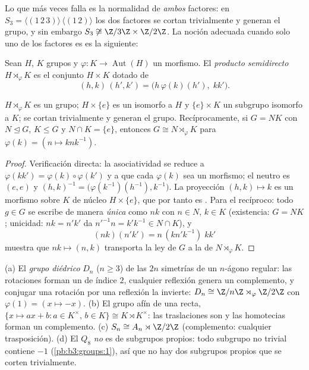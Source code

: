Lo que más veces falla es la normalidad de \emph{ambos} factores: en
$S_3
= \langle (1\,2\,3)\rangle \,\langle(1\,2)\rangle$ los dos factores se
cortan trivialmente y generan el grupo, y sin embargo
$S_3 \not\cong \Z/3\Z \times
\Z/2\Z$. La noción adecuada cuando solo uno de los factores es
 es la siguiente:

\begin{definition}\label{def:b3:groups:semidirect}
Sean $H$, $K$ grupos y $\varphi \colon K \to
\operatorname{Aut}(H)$ un morfismo. El \emph{producto
semidirecto} $H \rtimes_\varphi K$ es el
conjunto $H \times K$ dotado de
\[
(h, k)\,(h', k') = \bigl(h\,\varphi(k)(h'),\; kk'\bigr).
\]
\end{definition}

\begin{proposition}\label{prop:b3:groups:semidirect}
$H \rtimes_\varphi K$ es un grupo; $H \times \{e\}$ es un
 isomorfo a $H$ y
$\{e\} \times K$ un subgrupo isomorfo a $K$; se cortan trivialmente y
generan el grupo. Recíprocamente, si $G =
NK$ con $N \trianglelefteq G$, $K \leq G$ y $N \cap K = \{e\}$, entonces
$G \cong N \rtimes_\varphi K$ para $\varphi(k) = (n \mapsto
knk^{-1})$.
\end{proposition}

\begin{proof}
Verificación directa: la asociatividad se reduce a $\varphi(kk') =
\varphi(k)\circ\varphi(k')$ y a que cada $\varphi(k)$ sea un morfismo;
el neutro es $(e,e)$ y $(h,k)^{-1} =
\bigl(\varphi(k^{-1})(h^{-1}), k^{-1}\bigr)$. La proyección $(h,k)
\mapsto k$ es un morfismo sobre $K$ de núcleo $H \times \{e\}$, que por
tanto es . Para el recíproco: todo
$g \in G$ se escribe de manera \emph{única} como $nk$ con $n \in N$,
$k \in K$ (existencia: $G =
NK$; unicidad: $nk = n'k'$ da $n'^{-1}n = k'k^{-1} \in N \cap
K$), y
\[
(nk)(n'k') = n\,(kn'k^{-1})\;kk'
\]
muestra que $nk \mapsto (n, k)$ transporta la ley de $G$ a la de
$N \rtimes_\varphi K$.
\end{proof}

\begin{example}\label{ex:b3:groups:semidirectexamples}
(a) El \emph{grupo diédrico} $D_n$ ($n \geq
3$) de las $2n$ simetrías de un $n$-ágono regular: las rotaciones forman
un  de índice $2$,
cualquier reflexión genera un complemento, y conjugar una rotación por
una reflexión la invierte: $D_n \cong \Z/n\Z \rtimes_\varphi \Z/2\Z$ con
$\varphi(1) = (x
\mapsto -x)$. (b) El grupo afín de una recta,
$\{x \mapsto ax + b : a \in
K^\times,\, b \in K\} \cong K \rtimes K^\times$: las traslaciones son
 y las homotecias forman un
complemento. (c) $S_n \cong A_n \rtimes \Z/2\Z$ (complemento: cualquier
trasposición). (d) El 
$Q_8$ \emph{no} es  de subgrupos propios: todo subgrupo no trivial contiene
$-1$ (\cref{pb:b3:groups:1}), así que no hay dos subgrupos propios que
se corten trivialmente.
\end{example}

